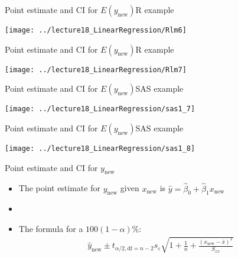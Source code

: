 \documentclass[xcolor=dvipsnames]{beamer}
\begin{document}
\begin{frame}{Point estimate and CI for $E(y_{\text{new}})$}{R example}
	\begin{center}
		\texttt{[image: ../lecture18\_LinearRegression/Rlm6]}
	\end{center}
\end{frame}

\begin{frame}{Point estimate and CI for $E(y_{\text{new}})$}{R example}
	\begin{center}
		\texttt{[image: ../lecture18\_LinearRegression/Rlm7]}
	\end{center}
\end{frame}

\begin{frame}{Point estimate and CI for $E(y_{\text{new}})$}{SAS example}
	\begin{center}
		\texttt{[image: ../lecture18\_LinearRegression/sas1\_7]}
	\end{center}
\end{frame}

\begin{frame}{Point estimate and CI for $E(y_{\text{new}})$}{SAS example}
	\begin{center}
		\texttt{[image: ../lecture18\_LinearRegression/sas1\_8]}
	\end{center}
\end{frame}

\begin{frame}{Point estimate and CI for $y_{\text{new}}$}
	\begin{itemize}
		\item The point estimate for $y_{\text{new}}$ given $x_{\text{new}}$ is $\hat{y}=\hat{\beta}_0 + \hat{\beta}_1 x_{\text{new}}$ \pause
		\item[]
		\item The formula for a $100(1-\alpha)\%$: \pause
		\begin{gather*}
			\hat{y}_{\text{new}} \pm t_{\alpha / 2, \text{df} = n-2}s_{\varepsilon}\sqrt{1+\frac{1}{n} + \frac{(x_{\text{new}}-\bar{x})^2}{S_{xx}}}
		\end{gather*}
	\end{itemize}
\end{frame}
\end{document}
